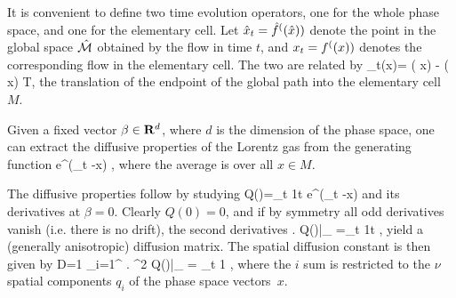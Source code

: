 It is convenient to define two time evolution operators, one
for the whole phase space, and one for the elementary cell.
Let $\hat x_t={\hat{f}^{(}(\hat x)})$ denote the point in
the global space $\hat {{\cal M}}$ obtained by the flow in time $t$,
and $x_t={f^{(}(x)})$ denotes the corresponding flow in
the elementary cell. The two are related by
\beq \hn_t(x)= \hflow ( x) - \flow ( x) \in T\;,\label{hatn} \eeq
the translation of the endpoint of the global path into the elementary cell $M$.

Given a fixed vector $\beta \in {\bf R}^d$, where $d$ is the dimension of the
phase space, one can extract the diffusive properties of the Lorentz gas from
the generating function
\beq \langle e^{\beta \cdot (\hx_t -x) } \rangle\;,\label{generate} \eeq
where the average is over all $x \in M$.

The diffusive properties follow by studying
\beq Q(\beta)=\lim_{t\rightarrow \infty} {1\over t} \log
    \langle e^{\beta \cdot (\hx_t -x) } \rangle \label{Q} \eeq
and its derivatives at $\beta=0$. Clearly $Q(0)=0$, and if by symmetry all odd
derivatives vanish (i.e. there is no drift), the second derivatives
\beq \left . {{\partial} }
    {{\partial} }
    Q(\beta)\right |_{} =\lim_{t\rightarrow \infty} {1\over t}
     \rangle\;, \eeq
yield a (generally anisotropic) diffusion matrix.
The spatial diffusion constant is then given by
\beq D={1\over {2 \nu}} \sum_{i=1}^{\nu} \left .
    {{\partial}^2 }
   Q(\beta)\right |_{} = \lim_{t\rightarrow \infty} {1}
    \rangle\;, \label{diffus}\eeq
where the $i$ sum is restricted to the $\nu$ spatial components $q_i$ of
the phase space vectors~$x$.

